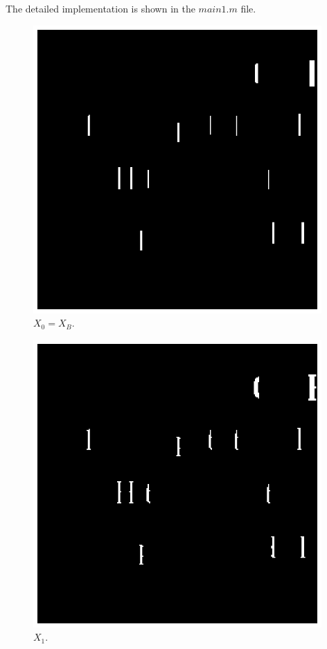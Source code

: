 \documentclass[paper=a4, fontsize=11pt]{scrartcl}
\begin{document}
The detailed implementation is shown in the $main1.m $ file. 


\begin{figure}
	\centering
	\includegraphics[width=11cm]{Q1_X0.eps}
	\caption{$X_0 = X_B$.}
	\label{fig:1}
\end{figure}


\begin{figure}
	\centering
	\includegraphics[width=11cm]{Q1_X1.eps}
	\caption{$X_1$.}
	\label{fig:2}
\end{figure}
\end{document}
